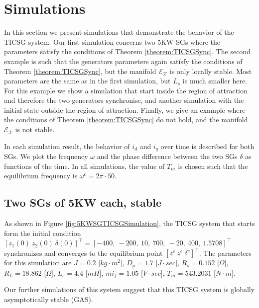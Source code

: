 \documentclass[letterpaper, 10 pt, conference]{ieeeconf}
\renewcommand{\o}    {{\omega}}
\newcommand{\Emscr}  {{\mathcal{E}}}
\newcommand{\Xmscr}  {{\mathcal{X}}}
\begin{document}
\section{Simulations} \label{sec6} %

In this section we present simulations that demonstrate the behavior
of the TICSG system. Our first simulation concerns two 5KW SGs where
the parameters satisfy the conditions of Theorem
\ref{theorem:TICSGSync}. The second example is such that the
generators parameters again satisfy the conditions of Theorem
\ref{theorem:TICSGSync}, but the manifold $\Emscr_\Xmscr$ is only
locally stable. Most parameters are the same as in the first
simulation, but $L_s$ is much smaller here. For this example we show
a simulation that start inside the region of attraction and therefore
the two generators synchronise, and another simulation with the 
initial state outside the region of attraction. Finally, we give an
example where the conditions of Theorem \ref{theorem:TICSGSync} do 
not hold, and the manifold $\Emscr_\Xmscr$ is not stable.

In each simulation result, the behavior of $i_d$ and $i_q$ over time
is described for both SGs. We plot the frequency $\o$ and the phase 
difference between the two SGs $\delta$ as functions of the time. In 
all simulations, the value of $T_m$ is chosen such that the 
equilibrium frequency is $\o^e=2\pi\cdot 50$.

\subsection{Two SGs of 5KW each, stable}

As shown in Figure \ref{fig:5KWSGTICSGSimulation}, the TICSG system
that starts form the initial condition $\left[z_1(0)\ z_2(0) \ 
\delta(0) \right]^\top = \left[ -400, \  -200,  \  10, \   700, \ -20, 
\  400, \ 1.5708 \right]^\top$ synchronizes and converges to the 
equilibrium point $\left[z^e\ z^e \ \delta^e \right]^\top$. The 
parameters for this simulation are $J=0.2$ {[}$kg\cdot m^{2}${]}, 
$D_p=1.7$ {[}$J\cdot sec${]}, $R_s=0.152$ {[}$\Omega]$, $R_L=18.862$ 
{[}$\Omega]$, $L_{s}=4.4$ {[}$mH${]}, $mi_{f}=1.05$ {[}$V\cdot sec]$, 
$T_m=543.2031$ {[}$N\cdot m${]}.

Our further simulations of this system suggest that this TICSG system 
is globally asymptotically stable (GAS).
\end{document}
